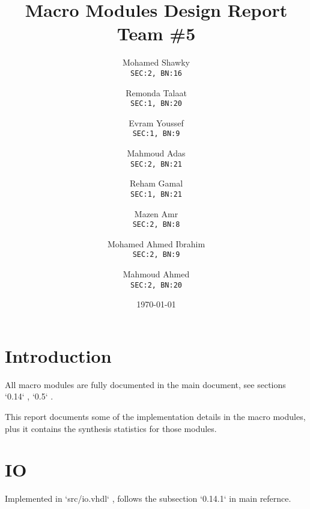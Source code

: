 \documentclass[12pt]{report}
\title{\textbf{Macro Modules Design Report}\\Team \#5}
\author{
  Mohamed Shawky\\
  \small\texttt{SEC:2, BN:16}
  \and
  Remonda Talaat\\
  \small\texttt{SEC:1, BN:20}
  \and
  Evram Youssef\\
  \small\texttt{SEC:1, BN:9}
  \and
  Mahmoud Adas\\
  \small\texttt{SEC:2, BN:21}
  \and
  Reham Gamal\\
  \small\texttt{SEC:1, BN:21}
  \and
  Mazen Amr\\
  \small\texttt{SEC:2, BN:8}
  \and
  Mohamed Ahmed Ibrahim\\
  \small\texttt{SEC:2, BN:9}
  \and
  Mahmoud Ahmed\\
  \small\texttt{SEC:2, BN:20}
}
\date{\today}
\begin{document}
    \thispagestyle{empty}

    \maketitle
    \tableofcontents
    \clearpage


    \section{Introduction}
    All macro modules are fully documented in the main document, see sections `0.14` , `0.5` . 

This report documents some of the implementation details in the macro modules, plus it contains the synthesis statistics for those modules.

    \section{IO}
    Implemented in `src/io.vhdl` , follows the subsection `0.14.1` in main refernce. 
\end{document}
